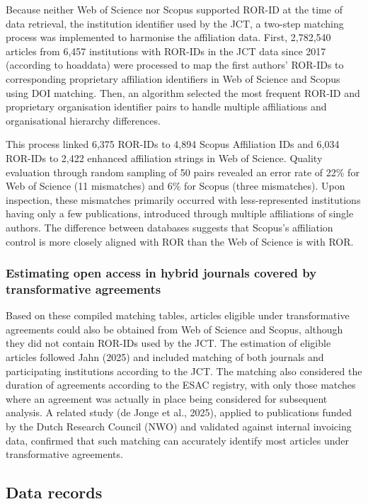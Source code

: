 \documentclass[a4paper,man,floatsintext,longtable,noextraspace,10pt]{apa6}
\begin{document}
Because neither Web of Science nor Scopus supported ROR-ID at the time
of data retrieval, the institution identifier used by the JCT, a
two-step matching process was implemented to harmonise the affiliation
data. First, 2,782,540 articles from 6,457 institutions with ROR-IDs in
the JCT data since 2017 (according to hoaddata) were processed to map
the first authors' ROR-IDs to corresponding proprietary affiliation
identifiers in Web of Science and Scopus using DOI matching. Then, an
algorithm selected the most frequent ROR-ID and proprietary organisation
identifier pairs to handle multiple affiliations and organisational
hierarchy differences.

This process linked 6,375 ROR-IDs to 4,894 Scopus Affiliation IDs and
6,034 ROR-IDs to 2,422 enhanced affiliation strings in Web of Science.
Quality evaluation through random sampling of 50 pairs revealed an error
rate of 22\% for Web of Science (11 mismatches) and 6\% for Scopus
(three mismatches). Upon inspection, these mismatches primarily occurred
with less-represented institutions having only a few publications,
introduced through multiple affiliations of single authors. The
difference between databases suggests that Scopus's affiliation control
is more closely aligned with ROR than the Web of Science is with ROR.

\subsubsection{Estimating open access in hybrid journals covered by
transformative
agreements}\label{estimating-open-access-in-hybrid-journals-covered-by-transformative-agreements}

Based on these compiled matching tables, articles eligible under
transformative agreements could also be obtained from Web of Science and
Scopus, although they did not contain ROR-IDs used by the JCT. The
estimation of eligible articles followed Jahn (2025) and included
matching of both journals and participating institutions according to
the JCT. The matching also considered the duration of agreements
according to the ESAC registry, with only those matches where an
agreement was actually in place being considered for subsequent
analysis. A related study (de Jonge et al., 2025), applied to
publications funded by the Dutch Research Council (NWO) and validated
against internal invoicing data, confirmed that such matching can
accurately identify most articles under transformative agreements.

\subsection{Data records}\label{data-records}
\end{document}
